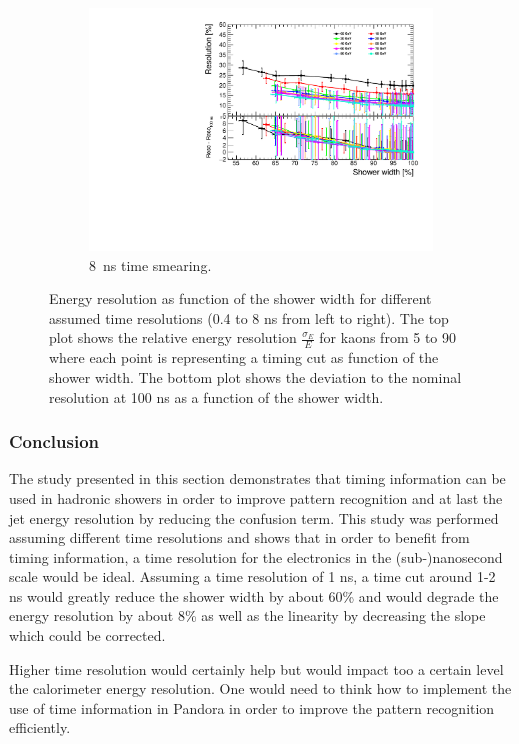\begin{figure}[htbp!]
\begin{subfigure}[t]{0.48\textwidth}
    \centering
    \includegraphics[width=1\linewidth]{../Thesis_Plots/ILD/Smearing_8ns/Plots/ShowerWidth_Resolution_Smearing3}
    \caption{\SI{8}{\nano\second} time smearing.}  \label{fig:WidthReso8ns}
  \end{subfigure}
  \caption{Energy resolution as function of the shower width for different assumed time resolutions (0.4 to 8 ns from left to right). The top plot shows the relative energy resolution $\frac{\sigma_{E}}{E}$ for kaons from 5 to 90 \GeV where each point is representing a timing cut as function of the shower width. The bottom plot shows the deviation to the nominal resolution at 100 ns as a function of the shower width.}
\end{figure}

\subsubsection{Conclusion}

The study presented in this section demonstrates that timing information can be used in hadronic showers in order to improve pattern recognition and at last the jet energy resolution by reducing the confusion term. This study was performed assuming different time resolutions and shows that in order to benefit from timing information, a time resolution for the electronics in the (sub-)nanosecond scale would be ideal. Assuming a time resolution of 1 ns, a time cut around 1-2 ns would greatly reduce the shower width by about 60\% and would degrade the energy resolution by about 8\% as well as the linearity by decreasing the slope which could be corrected.

Higher time resolution would certainly help but would impact too a certain level the calorimeter energy resolution. One would need to think how to implement the use of time information in Pandora in order to improve the pattern recognition efficiently.
